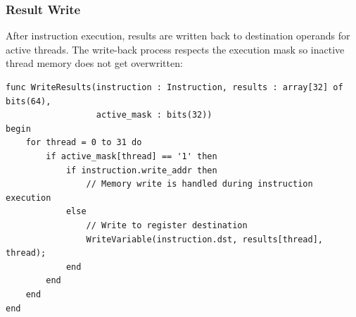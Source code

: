 \subsubsection{Result Write}
\label{subsec:result_writeback}

After instruction execution, results are written back to destination operands
for active threads. The write-back process respects the execution mask so
inactive thread memory does not get overwritten:

\begin{lstlisting}[caption={Result Writeback Implementation}, label={lst:result_writeback}]
func WriteResults(instruction : Instruction, results : array[32] of bits(64), 
                  active_mask : bits(32))
begin
    for thread = 0 to 31 do
        if active_mask[thread] == '1' then
            if instruction.write_addr then
                // Memory write is handled during instruction execution
            else
                // Write to register destination
                WriteVariable(instruction.dst, results[thread], thread);
            end
        end
    end
end
\end{lstlisting}






